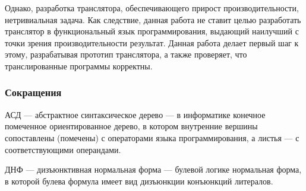 Однако, разработка транслятора, обеспечивающего прирост производительности, нетривиальная задача.
Как следствие, данная работа не ставит целью разработать транслятор в функциональный язык программирования, выдающий наилучший с точки зрения производительности результат.
Данная работа делает первый шаг к этому, разрабатывая прототип транслятора, а также проверяет, что транслированные программы корректны.

\subsubsection*{Сокращения}

АСД --- абстрактное синтаксическое дерево --- в информатике конечное помеченное ориентированное дерево, в котором внутренние вершины сопоставлены (помечены) с операторами языка программирования, а листья --- с соответствующими операндами.

ДНФ --- дизъюнктивная нормальная форма --- булевой логике нормальная форма, в которой булева формула имеет вид дизъюнкции конъюнкций литералов.
